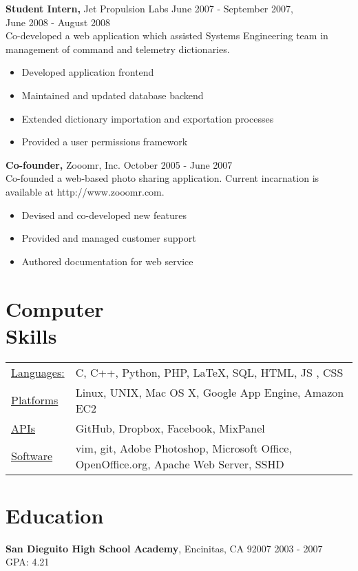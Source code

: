\documentclass[margin]{res}
\begin{document}
\begin{resume}
 {\bf Student Intern,} Jet Propulsion Labs \hfill June 2007 - September 2007, \\
 \makebox[2.9in]{\hfill} June 2008 - August 2008 \\ 
 Co-developed a web application which assisted Systems Engineering team in management of command and telemetry dictionaries.
 \begin{itemize}
 \item Developed application frontend
 \item Maintained and updated database backend
 \item Extended dictionary importation and exportation processes
 \item Provided a user permissions framework
 \end{itemize} 

 {\bf Co-founder,} Zooomr, Inc. \hfill October 2005 - June 2007 \\
 Co-founded a web-based photo sharing application.  Current incarnation is available at http://www.zooomr.com.
 \begin{itemize}
 \item Devised and co-developed new features
 \item Provided and managed customer support
 \item Authored documentation for web service
 \end{itemize} 

\section{Computer \\ Skills}
   \begin{tabular}{l p{3in}}
   \underline{Languages:} & C, C++, Python, PHP, \LaTeX, SQL, HTML, JS , CSS  \\
   \underline{Platforms} & Linux, UNIX, Mac OS X, Google App Engine, Amazon EC2\\
   \underline{APIs} & GitHub, Dropbox, Facebook, MixPanel\\
   \underline{Software} & vim, git, Adobe Photoshop, Microsoft Office, OpenOffice.org, Apache Web Server, SSHD\\
 \end{tabular}

\section{Education} 
{\bf San Dieguito High School Academy}, Encinitas, CA 92007 \hfill 2003 - 2007 \\
 GPA: 4.21


\end{resume}
\end{document}
